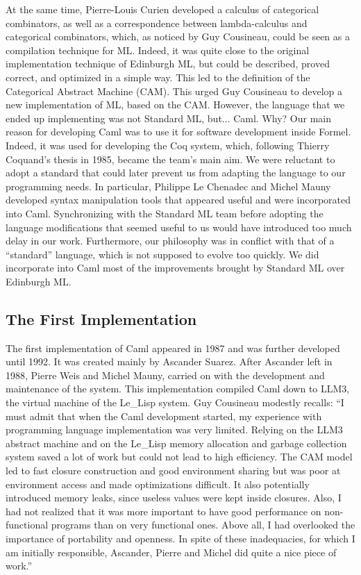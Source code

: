 \documentclass[14pt]{matmex-diploma-custom}
\begin{document}
At the same time, Pierre-Louis Curien developed a calculus of categorical combinators, as well as a correspondence between lambda-calculus and categorical combinators, which, as noticed by Guy Cousineau, could be seen as a compilation technique for ML. Indeed, it was quite close to the original implementation technique of Edinburgh ML, but could be described, proved correct, and optimized in a simple way. This led to the definition of the Categorical Abstract Machine (CAM).
This urged Guy Cousineau to develop a new implementation of ML, based on the CAM. However, the language that we ended up implementing was not Standard ML, but... Caml. Why? Our main reason for developing Caml was to use it for software development inside Formel. Indeed, it was used for developing the Coq system, which, following Thierry Coquand's thesis in 1985, became the team's main aim. We were reluctant to adopt a standard that could later prevent us from adapting the language to our programming needs. In particular, Philippe Le Chenadec and Michel Mauny developed syntax manipulation tools that appeared useful and were incorporated into Caml. Synchronizing with the Standard ML team before adopting the language modifications that seemed useful to us would have introduced too much delay in our work. Furthermore, our philosophy was in conflict with that of a “standard” language, which is not supposed to evolve too quickly. We did incorporate into Caml most of the improvements brought by Standard ML over Edinburgh ML.

\subsection{The First Implementation}
The first implementation of Caml appeared in 1987 and was further developed until 1992. It was created mainly by Ascander Suarez. After Ascander left in 1988, Pierre Weis and Michel Mauny, carried on with the development and maintenance of the system. This implementation compiled Caml down to LLM3,
the virtual machine of the Le\_Lisp system. Guy Cousineau modestly recalls: “I must admit that when the Caml development started, my experience with programming language implementation was very limited. Relying on the LLM3 abstract machine and on the Le\_Lisp memory allocation and garbage collection system saved a lot of work but could not lead to high efficiency. The CAM model led to fast closure construction and good environment sharing but was poor at environment access and made optimizations difficult. It also potentially introduced memory leaks, since useless values were kept inside closures. Also, I had not realized that it was more important to have good performance on non-functional programs than on very functional ones. Above all, I had overlooked the importance of portability and openness. In spite of these inadequacies, for which I am initially responsible, Ascander, Pierre and Michel did quite a nice piece of work.”
\end{document}
